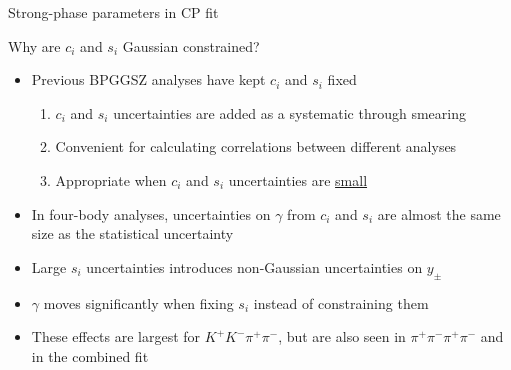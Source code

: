 \documentclass{beamer}
\begin{document}
\begin{frame}{Strong-phase parameters in CP fit}
  \begin{center}
    {\large Why are $c_i$ and $s_i$ Gaussian constrained?}
  \end{center}
  \begin{itemize}
    \setlength\itemsep{1.0em}
    \item{Previous BPGGSZ analyses have kept $c_i$ and $s_i$ fixed}
    \begin{enumerate}
      \item{$c_i$ and $s_i$ uncertainties are added as a systematic through smearing}
      \item{Convenient for calculating correlations between different analyses}
      \item{Appropriate when $c_i$ and $s_i$ uncertainties are \underline{small}}
    \end{enumerate}
    \item{In four-body analyses, uncertainties on $\gamma$ from $c_i$ and $s_i$ are almost the same size as the statistical uncertainty}
    \item{Large $s_i$ uncertainties introduces non-Gaussian uncertainties on $y_\pm$}
    \item{$\gamma$ moves significantly when fixing $s_i$ instead of constraining them}
    \item{These effects are largest for $K^+K^-\pi^+\pi^-$, but are also seen in $\pi^+\pi^-\pi^+\pi^-$ and in the combined fit}
  \end{itemize}
\end{frame}
\end{document}
